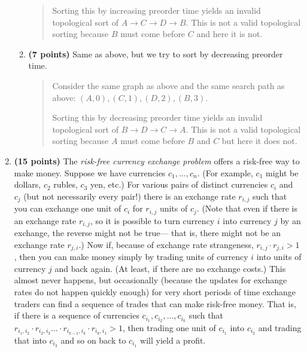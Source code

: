 \documentclass[11pt]{article}
\begin{document}
\begin{enumerate}
\begin{enumerate}
\begin{quote}
  \medskip
  Sorting this by increasing preorder time yields an invalid topological sort of $A \rightarrow C \rightarrow D \rightarrow B$. This is not a valid topological sorting because $B$ must come before $C$ and here it is not.
  
\end{quote}

\item 
{\bf (7 points)}
Same as above, but we try to sort by decreasing preorder time.
\begin{quote}
  \color{purple}
  Consider the same graph as above and the same search path as above: $(A, 0), (C, 1), (D, 2), (B, 3)$.

  \medskip
  Sorting this by decreasing preorder time yields an invalid topological sort of $B \rightarrow D \rightarrow C \rightarrow A$. This is not a valid  topological sorting because $A$ must come before $B$ and $C$ but here it does not.
\end{quote}

\end{enumerate}


\item
{\bf (15 points)}
The {\em risk-free currency exchange problem} offers a risk-free way
to make money.  Suppose we have currencies $c_1,\ldots,c_n$.  (For
example, $c_1$ might be dollars, $c_2$ rubles, $c_3$ yen, etc.)  For
various pairs of distinct currencies $c_i$ and $c_j$ (but not
necessarily every pair!) there is an exchange rate $r_{i,j}$ such that
you can exchange one unit of $c_i$ for $r_{i,j}$ units of $c_j$.
(Note that even if there is an exchange rate $r_{i,j}$, so it is possible to
turn currency $i$ into currency $j$ by an exchange, the reverse might not
be true--- that is, there might
not be an exchange rate $r_{j,i}$.)  Now if, because of exchange rate
strangeness, $r_{i,j} \cdot r_{j,i} > 1$, then you can make money
simply by trading units of currency $i$ into units of currency $j$ and
back again.  (At least, if there are no exchange costs.)  This almost
never happens, but occasionally (because the updates for exchange
rates do not happen quickly enough) for very short periods of time
exchange traders can find a sequence of trades that can make risk-free
money.  That is, if there is a sequence of currencies
$c_{i_1},c_{i_2},\ldots,c_{i_k}$ such that $r_{{i_1},{i_2}} \cdot
r_{{i_2},{i_3}} \ldots \cdot r_{{i_{k-1}},{i_k}} \cdot r_{{i_k},{i_1}}
> 1$, then trading one unit of $c_{i_1}$ into $c_{i_2}$ and trading
that into $c_{i_3}$ and so on back to $c_{i_1}$ will yield a profit.


\end{enumerate}
\end{document}

